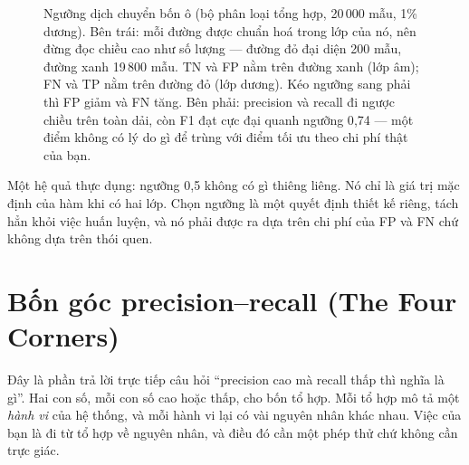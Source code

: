 \documentclass[../../deep_learning.tex]{subfiles}
\begin{document}
\begin{figure}[H]
{}
\caption{Ngưỡng dịch chuyển bốn ô (bộ phân loại tổng hợp, 20\,000 mẫu, 1\% dương). Bên trái: mỗi đường được chuẩn hoá trong lớp của nó, nên đừng đọc chiều cao như số lượng --- đường đỏ đại diện 200 mẫu, đường xanh 19\,800 mẫu. TN và FP nằm trên đường xanh (lớp âm); FN và TP nằm trên đường đỏ (lớp dương). Kéo ngưỡng sang phải thì FP giảm và FN tăng. Bên phải: precision và recall đi ngược chiều trên toàn dải, còn F1 đạt cực đại quanh ngưỡng 0{,}74 --- một điểm không có lý do gì để trùng với điểm tối ưu theo chi phí thật của bạn.}
\label{fig:b07-nguong}
\end{figure}

Một hệ quả thực dụng: ngưỡng 0{,}5 không có gì thiêng liêng. Nó chỉ là giá trị mặc định của hàm  khi có hai lớp. Chọn ngưỡng là một quyết định thiết kế riêng, tách hẳn khỏi việc huấn luyện, và nó phải được ra dựa trên chi phí của FP và FN chứ không dựa trên thói quen.
\section{Bốn góc precision--recall (The Four Corners)}
Đây là phần trả lời trực tiếp câu hỏi ``precision cao mà recall thấp thì nghĩa là gì''. Hai con số, mỗi con số cao hoặc thấp, cho bốn tổ hợp. Mỗi tổ hợp mô tả một \emph{hành vi} của hệ thống, và mỗi hành vi lại có vài nguyên nhân khác nhau. Việc của bạn là đi từ tổ hợp về nguyên nhân, và điều đó cần một phép thử chứ không cần trực giác.
\end{document}
